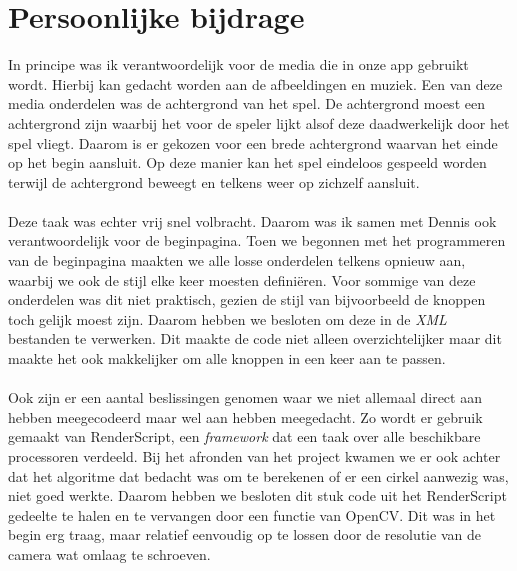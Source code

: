 \documentclass{uva-inf-article}
\begin{document}
\section{Persoonlijke bijdrage}
In principe was ik verantwoordelijk voor de media die in onze app gebruikt wordt.
Hierbij kan gedacht worden aan de afbeeldingen en muziek. Een van deze media onderdelen
was de achtergrond van het spel. De achtergrond moest een achtergrond zijn waarbij
het voor de speler lijkt alsof deze daadwerkelijk door het spel vliegt. Daarom is
er gekozen voor een brede achtergrond waarvan het einde op het begin aansluit.
Op deze manier kan het spel eindeloos gespeeld worden terwijl de achtergrond
beweegt en telkens weer op zichzelf aansluit.
\\\\Deze taak was echter vrij snel volbracht. Daarom was ik samen met Dennis ook
verantwoordelijk voor de beginpagina.
Toen we begonnen met het programmeren van de beginpagina maakten we alle losse
onderdelen telkens opnieuw aan, waarbij we ook de stijl elke keer moesten defini\"{e}ren.
Voor sommige van deze onderdelen was dit niet praktisch, gezien de stijl van bijvoorbeeld
de knoppen toch gelijk moest zijn. Daarom hebben we besloten om deze in de \textit{XML} bestanden
te verwerken. Dit maakte de code niet alleen overzichtelijker maar dit maakte het
ook makkelijker om alle knoppen in een keer aan te passen.
\\\\Ook zijn er een aantal beslissingen genomen waar we niet allemaal direct aan hebben
meegecodeerd maar wel aan hebben meegedacht. Zo wordt er gebruik gemaakt van
RenderScript, een \textit{framework} dat een taak over alle beschikbare processoren
verdeeld. Bij het afronden van het project kwamen we er ook achter dat het algoritme
dat bedacht was om te berekenen of er een cirkel aanwezig was, niet goed werkte.
Daarom hebben we besloten dit stuk code uit het RenderScript gedeelte te halen en
te vervangen door een functie van OpenCV. Dit was in het begin erg traag, maar relatief
eenvoudig op te lossen door de resolutie van de camera wat omlaag te schroeven.

\end{document}
